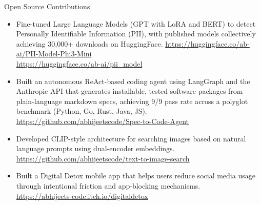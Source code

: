 \documentclass{resume} %
\begin{document}
\begin{rSection}{Open Source Contributions}
\begin{itemize}
    \item Fine-tuned Large Language Models (GPT with LoRA and BERT) to detect Personally Identifiable Information (PII), with published models collectively achieving 30,000+ downloads on HuggingFace.
    \url{https://huggingface.co/ab-ai/PII-Model-Phi3-Mini} \\
    \url{https://huggingface.co/ab-ai/pii_model}
    \item Built an autonomous ReAct-based coding agent using LangGraph and the Anthropic API that generates installable, tested software packages from plain-language markdown specs, achieving 9/9 pass rate across a polyglot benchmark (Python, Go, Rust, Java, JS). \url{https://github.com/abhijeetscode/Spec-to-Code-Agent}
    \item Developed CLIP-style architecture for searching images based on
    natural language prompts using dual-encoder embeddings. \\
    \url{https://github.com/abhijeetscode/text-to-image-search}
    \item  Built a Digital Detox mobile app that helps users reduce social media usage through intentional friction and app-blocking mechanisms. \\
    \url{https://abhijeets-code.itch.io/digitaldetox}

\end{itemize}
\end{rSection}
\end{document}
